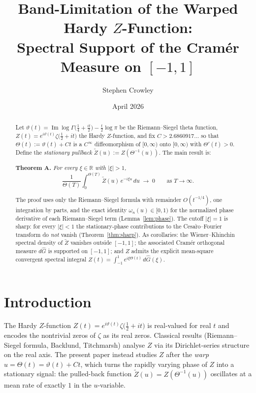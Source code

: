 \documentclass[12pt]{amsart}
\title[Band-Limitation of the Warped Hardy $Z$-Function]
      {Band-Limitation of the Warped Hardy $Z$-Function:\\
       Spectral Support of the Cram\'{e}r Measure on $[-1,1]$}
\author{Stephen Crowley}
\date{April 2026}
\theoremstyle{definition}
\theoremstyle{remark}
\DeclareMathOperator{\im}{Im}
\newcommand{\R}{\mathbb{R}}
\newcommand{\Zt}{\widetilde{Z}}
\begin{document}
\maketitle

\begin{abstract}
Let $\vartheta(t)=\im\log\Gamma\!\bigl(\tfrac{1}{4}+\tfrac{it}{2}\bigr)
-\tfrac{t}{2}\log\pi$ be the Riemann--Siegel theta function,
$Z(t)=e^{i\vartheta(t)}\zeta\!\bigl(\tfrac{1}{2}+it\bigr)$ the Hardy
$Z$-function, and fix $C>2.6860917\ldots$ so that
$\Theta(t)\!:=\!\vartheta(t)+Ct$ is a $C^{\infty}$ diffeomorphism of
$[0,\infty)$ onto $[0,\infty)$ with $\Theta'(t)>0$.
Define the \emph{stationary pullback} $\Zt(u)\!:=\!Z(\Theta^{-1}(u))$.
The main result is:

\medskip
\noindent\textbf{Theorem A.}
\textit{For every $\xi\in\R$ with $|\xi|>1$,}
\[
  \frac{1}{\Theta(T)}\int_0^{\Theta(T)}\Zt(u)\,e^{-i\xi u}\,du
  \;\longrightarrow\; 0
  \qquad\text{as }T\to\infty.
\]

\smallskip
The proof uses only the Riemann--Siegel formula with remainder
$O(t^{-1/4})$, one integration by parts, and the exact identity
$\omega_n(u)\in[0,1)$ for the normalized phase derivative of each
Riemann--Siegel term (Lemma~\ref{lem:phase}).
The cutoff $|\xi|=1$ is sharp: for every $|\xi|<1$ the stationary-phase
contributions to the Cesa\`{r}o--Fourier transform do \emph{not} vanish
(Theorem~\ref{thm:sharp}).
As corollaries: the Wiener--Khinchin spectral density of $\Zt$ vanishes
outside $[-1,1]$; the associated Cram\'{e}r orthogonal measure $d\hat G$
is supported on $[-1,1]$; and $Z$ admits the explicit mean-square
convergent spectral integral $Z(t)=\int_{-1}^{1}e^{i\xi\Theta(t)}\,d\hat G(\xi)$.
\end{abstract}

\section{Introduction}\label{sec:intro}

The Hardy $Z$-function $Z(t)=e^{i\vartheta(t)}\zeta\!\bigl(\tfrac{1}{2}+it\bigr)$
is real-valued for real $t$ and encodes the nontrivial zeros of $\zeta$
as its real zeros.  Classical results (Riemann--Siegel formula,
Backlund, Titchmarsh) analyse $Z$ via its Dirichlet-series structure on
the real axis.  The present paper instead studies $Z$ after the
\emph{warp} $u=\Theta(t)=\vartheta(t)+Ct$, which turns the rapidly
varying phase of $Z$ into a stationary signal: the pulled-back function
$\Zt(u)=Z(\Theta^{-1}(u))$ oscillates at a mean rate of exactly $1$
in the $u$-variable.
\end{document}
